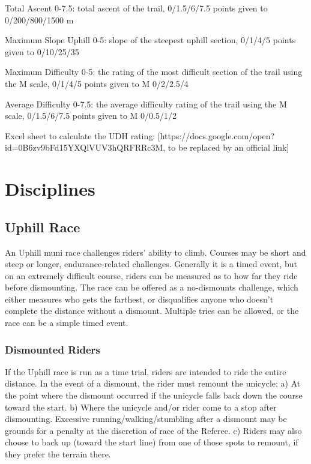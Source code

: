 Total Ascent 0-7.5: total ascent of the trail, 0/1.5/6/7.5 points given to 0/200/800/1500 m

Maximum Slope Uphill 0-5: slope of the steepest uphill section, 0/1/4/5 points given to 0/10/25/35%

Maximum Difficulty 0-5: the rating of the most difficult section of the trail using the M scale, 0/1/4/5 points given to M 0/2/2.5/4

Average Difficulty 0-7.5: the average difficulty rating of the trail using the M scale, 0/1.5/6/7.5 points given to M 0/0.5/1/2

Excel sheet to calculate the UDH rating: [https://docs.google.com/open?id=0B6zv9bFd15YXQlVUV3hQRFRRc3M, to be replaced by an official link]


\section{Disciplines}

\subsection{Uphill Race}
An Uphill muni race challenges riders' ability to climb. Courses may be short
and steep or longer, endurance-related challenges. Generally it is a timed
event, but on an extremely difficult course, riders can be measured as to how
far they ride before dismounting. The race can be offered as a no-dismounts
challenge, which either measures who gets the farthest, or disqualifies anyone
who doesn't complete the distance without a dismount. Multiple tries can be
allowed, or the race can be a simple timed event.

\subsubsection{Dismounted Riders}
If the Uphill race is run as a time trial, riders are intended to ride the
entire distance. In the event of a dismount, the rider must remount the
unicycle: 
a) At the point where the dismount occurred if the unicycle falls back
down the course toward the start. 
b) Where the unicycle and/or rider come to a
stop after dismounting. Excessive running/walking/stumbling after a dismount may
be grounds for a penalty at the discretion of race of the Referee. 
c) Riders may
also choose to back up (toward the start line) from one of those spots to
remount, if they prefer the terrain there.
 

